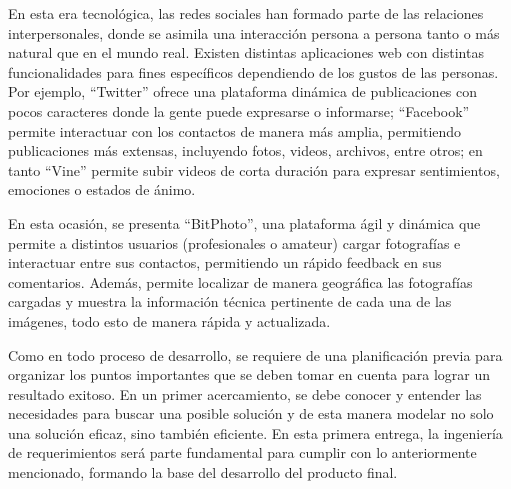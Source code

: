 \documentclass{memoria}
\begin{document}


\indices


En esta era tecnológica, las redes sociales han formado parte de las relaciones interpersonales, donde se asimila una interacción persona a persona tanto o más natural que en el mundo real. Existen distintas aplicaciones web con distintas funcionalidades para fines específicos dependiendo de los gustos de las personas. Por ejemplo, “Twitter” ofrece una plataforma dinámica de publicaciones con pocos caracteres donde la gente puede expresarse o informarse; “Facebook” permite interactuar con los contactos de manera más amplia, permitiendo publicaciones más extensas, incluyendo fotos, videos, archivos, entre otros; en tanto “Vine” permite subir videos de corta duración para expresar sentimientos, emociones o estados de ánimo.

En esta ocasión, se presenta “BitPhoto”, una plataforma ágil y dinámica que permite a distintos usuarios (profesionales o amateur) cargar fotografías e interactuar entre sus contactos, permitiendo un rápido feedback en sus comentarios. Además, permite localizar de manera geográfica las fotografías cargadas y muestra la información técnica pertinente de cada una de las imágenes, todo esto de manera rápida y actualizada.

Como en todo proceso de desarrollo, se requiere de una planificación previa para organizar los puntos importantes que se deben tomar en cuenta para lograr un resultado exitoso. En un primer acercamiento, se debe conocer y entender las necesidades para buscar una posible solución y de esta manera modelar no solo una solución eficaz, sino también eficiente. En esta primera entrega, la ingeniería de requerimientos será parte fundamental para cumplir con lo anteriormente mencionado, formando la base del desarrollo del producto final.
\end{document}
